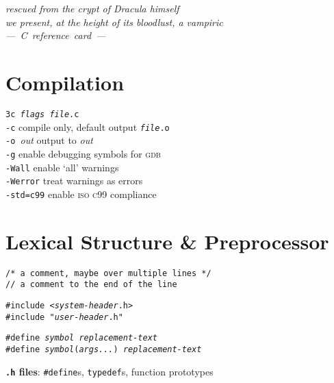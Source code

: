 \documentclass[8pt]{article}
\newcommand{\Cc}[1]{\texttt{#1}}
\newcommand{\cmt}[1]{\textcolor[gray]{.3}{\texttt{#1}}} %
\newcommand{\cpp}[1]{\textcolor{black!20!cyan}{\texttt{\##1}}} %
\newcommand{\kw}[1]{\textcolor{black!40!lime}{\texttt{#1}}} %
\newcommand{\quo}[1]{\textcolor{violet!80!black}{\texttt{#1}}} %
\newcommand{\opt}[1]{\textrm{\textit{#1}}} %
\newcommand{\leadingone}{rescued from the crypt of Dracula himself}
\newcommand{\leadingtwo}{we present, at the height of its bloodlust, a vampiric}
\begin{document}
\begin{multicols}{3}

\begin{center}{\rmfamily
\itshape\leadingone\\ \leadingtwo \\
\Huge ---~C~reference~card~--- }\\
\end{center}

\section*{Compilation}

\Cc{3c \opt{flags} \opt{file}.c}\\
\hspace*{2.2em}\texttt{-c}\quad
    compile only, default output \Cc{\opt{file}.o}\\
\hspace*{2.2em}\texttt{-o~}\textit{out}\quad
    output to \opt{out}\\
\hspace*{2.2em}\texttt{-g}\quad
    enable debugging symbols for \textsc{gdb}\\
\hspace*{2.2em}\texttt{-Wall}\quad
    enable `all' warnings\\
\hspace*{2.2em}\texttt{-Werror}\quad
    treat warnings as errors\\
\hspace*{2.2em}\texttt{-std=c99}\quad
    enable \textsc{iso c99} compliance

\section*{Lexical Structure \& Preprocessor}

\Cc{\cmt{/* a comment, maybe over multiple lines */}}\\
\Cc{\cmt{// a comment to the end of the line}}

\Cc{\cpp{include} \quo{<\opt{system-header}.h>}}\\
\Cc{\cpp{include} \quo{"\opt{user-header}.h"}}

\Cc{\cpp{define} \opt{symbol} \opt{replacement-text}}\\
\Cc{\cpp{define} \opt{symbol}(\opt{args...}) \opt{replacement-text}}

\textbf{\texttt{.h} files}:
\cpp{define}s, \kw{typedef}s, function prototypes


\end{multicols}
\end{document}
